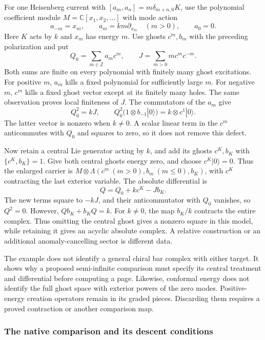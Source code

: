 \begin{example}\label{ex:fl19-central-ghost}
For one Heisenberg current with $[a_m,a_n]=m\delta_{m+n,0}K$, use the polynomial coefficient module $M=\mathbb C[x_1,x_2,\ldots]$ with mode action
\[
a_{-m}=x_m,\qquad a_m=km\partial_{x_m}\quad(m>0),\qquad a_0=0.
\]
Here $K$ acts by $k$ and $x_m$ has energy $m$.
Use ghosts $c^m,b_m$ with the preceding polarization and put
\[
Q_0=\sum_{m\in\mathbb Z}a_m c^m,
\qquad J=\sum_{m>0}m c^m c^{-m}.
\]
Both sums are finite on every polynomial with finitely many ghost excitations.
For positive $m$, $a_m$ kills a fixed polynomial for sufficiently large $m$.
For negative $m$, $c^m$ kills a fixed ghost vector except at its finitely many holes.
The same observation proves local finiteness of $J$.
The commutators of the $a_m$ give
\[
Q_0^2=kJ,
\qquad Q_0^2(1\otimes b_{-1}|0\rangle)
=k\otimes c^1|0\rangle.
\]
The latter vector is nonzero when $k\ne0$.
A scalar linear term in the $c^m$ anticommutes with $Q_0$ and squares to zero, so it does not remove this defect.

Now retain a central Lie generator acting by $k$, and add its ghosts $c^K,b_K$ with $\{c^K,b_K\}=1$.
Give both central ghosts energy zero, and choose $c^K|0\rangle=0$.
Thus the enlarged carrier is $M\otimes\Lambda(c^m\ (m>0),b_m\ (m\le0),b_K)$, with $c^K$ contracting the last exterior variable.
The absolute differential is
\[
Q=Q_0+k c^K-Jb_K.
\]
The new terms square to $-kJ$, and their anticommutator with $Q_0$ vanishes, so $Q^2=0$.
However, $Qb_K+b_KQ=k$.
For $k\ne0$, the map $b_K/k$ contracts the entire complex.
Thus omitting the central ghost gives a nonzero square in this model, while retaining it gives an acyclic absolute complex.
A relative construction or an additional anomaly-cancelling sector is different data.
\end{example}

The example does not identify a general chiral bar complex with either target.
It shows why a proposed semi-infinite comparison must specify its central treatment and differential before computing a page.
Likewise, conformal energy does not identify the full ghost space with exterior powers of the zero modes.
Positive-energy creation operators remain in its graded pieces.
Discarding them requires a proved contraction or another comparison map.

\subsubsection{The native comparison and its descent conditions}

